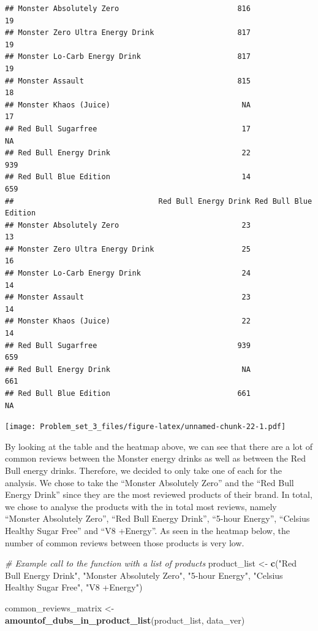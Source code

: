 \documentclass[
]{article}
\newenvironment{Shaded}{\begin{snugshade}}{\end{snugshade}}
\newcommand{\CommentTok}[1]{\textcolor[rgb]{0.56,0.35,0.01}{\textit{#1}}}
\newcommand{\FunctionTok}[1]{\textcolor[rgb]{0.13,0.29,0.53}{\textbf{#1}}}
\newcommand{\NormalTok}[1]{#1}
\newcommand{\OtherTok}[1]{\textcolor[rgb]{0.56,0.35,0.01}{#1}}
\newcommand{\StringTok}[1]{\textcolor[rgb]{0.31,0.60,0.02}{#1}}
\begin{document}
\begin{verbatim}
## Monster Absolutely Zero                           816                 19
## Monster Zero Ultra Energy Drink                   817                 19
## Monster Lo-Carb Energy Drink                      817                 19
## Monster Assault                                   815                 18
## Monster Khaos (Juice)                              NA                 17
## Red Bull Sugarfree                                 17                 NA
## Red Bull Energy Drink                              22                939
## Red Bull Blue Edition                              14                659
##                                 Red Bull Energy Drink Red Bull Blue Edition
## Monster Absolutely Zero                            23                    13
## Monster Zero Ultra Energy Drink                    25                    16
## Monster Lo-Carb Energy Drink                       24                    14
## Monster Assault                                    23                    14
## Monster Khaos (Juice)                              22                    14
## Red Bull Sugarfree                                939                   659
## Red Bull Energy Drink                              NA                   661
## Red Bull Blue Edition                             661                    NA
\end{verbatim}

\texttt{[image: Problem\_set\_3\_files/figure-latex/unnamed-chunk-22-1.pdf]}

By looking at the table and the heatmap above, we can see that there are
a lot of common reviews between the Monster energy drinks as well as
between the Red Bull energy drinks. Therefore, we decided to only take
one of each for the analysis. We chose to take the ``Monster Absolutely
Zero'' and the ``Red Bull Energy Drink'' since they are the most
reviewed products of their brand. In total, we chose to analyse the
products with the in total most reviews, namely ``Monster Absolutely
Zero'', ``Red Bull Energy Drink'', ``5-hour Energy'', ``Celsius Healthy
Sugar Free'' and ``V8 +Energy''. As seen in the heatmap below, the
number of common reviews between those products is very low.

\begin{Shaded}
\begin{Highlighting}[]
\CommentTok{\# Example call to the function with a list of products}
\NormalTok{product\_list }\OtherTok{\textless{}{-}} \FunctionTok{c}\NormalTok{(}\StringTok{"Red Bull Energy Drink"}\NormalTok{, }\StringTok{"Monster Absolutely Zero"}\NormalTok{, }\StringTok{"5{-}hour Energy"}\NormalTok{, }\StringTok{"Celsius Healthy Sugar Free"}\NormalTok{, }\StringTok{"V8 +Energy"}\NormalTok{)}

\NormalTok{common\_reviews\_matrix }\OtherTok{\textless{}{-}} \FunctionTok{amountof\_dubs\_in\_product\_list}\NormalTok{(product\_list, data\_ver)}
\end{Highlighting}
\end{Shaded}
\end{document}
